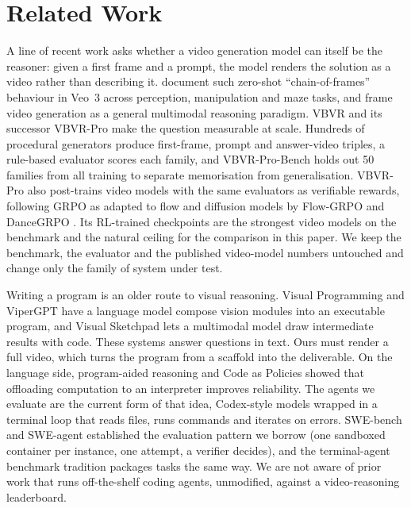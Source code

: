 \section{Related Work}
\label{sec:related}

A line of recent work asks whether a video generation model can itself be the reasoner: given a first frame and a prompt, the model renders the solution as a video rather than describing it. \citet{wiedemer2025videomodels} document such zero-shot ``chain-of-frames'' behaviour in Veo~3 across perception, manipulation and maze tasks, and \citet{tong2025thinkingwithvideo} frame video generation as a general multimodal reasoning paradigm. VBVR \citep{vbvrpro2026} and its successor VBVR-Pro \citep{vbvrpro2026} make the question measurable at scale. Hundreds of procedural generators produce first-frame, prompt and answer-video triples, a rule-based evaluator scores each family, and VBVR-Pro-Bench holds out 50 families from all training to separate memorisation from generalisation. VBVR-Pro also post-trains video models with the same evaluators as verifiable rewards, following GRPO \citep{shao2024deepseekmath,guo2025deepseekr1} as adapted to flow and diffusion models by Flow-GRPO \citep{liu2025flowgrpo} and DanceGRPO \citep{xue2025dancegrpo}. Its RL-trained checkpoints are the strongest video models on the benchmark and the natural ceiling for the comparison in this paper. We keep the benchmark, the evaluator and the published video-model numbers untouched and change only the family of system under test.

Writing a program is an older route to visual reasoning. Visual Programming \citep{gupta2023visprog} and ViperGPT \citep{suris2023vipergpt} have a language model compose vision modules into an executable program, and Visual Sketchpad \citep{hu2024sketchpad} lets a multimodal model draw intermediate results with code. These systems answer questions in text. Ours must render a full video, which turns the program from a scaffold into the deliverable. On the language side, program-aided reasoning \citep{gao2023pal,chen2023pot} and Code as Policies \citep{liang2023codeaspolicies} showed that offloading computation to an interpreter improves reliability. The agents we evaluate are the current form of that idea, Codex-style models \citep{chen2021codex} wrapped in a terminal loop that reads files, runs commands and iterates on errors. SWE-bench and SWE-agent \citep{jimenez2024swebench,yang2024sweagent} established the evaluation pattern we borrow (one sandboxed container per instance, one attempt, a verifier decides), and the terminal-agent benchmark tradition \citep{harbor2025} packages tasks the same way. We are not aware of prior work that runs off-the-shelf coding agents, unmodified, against a video-reasoning leaderboard.

